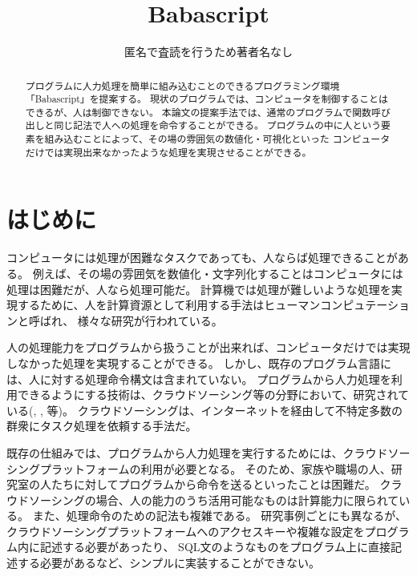 \documentclass[twoside]{wiss}
\begin{document}
\title{Babascript}
\etitle{} %

\author{匿名で査読を行うため著者名なし}

\begin{abstract}

プログラムに人力処理を簡単に組み込むことのできるプログラミング環境「Babascript」を提案する。
現状のプログラムでは、コンピュータを制御することはできるが、人は制御できない。
本論文の提案手法では、通常のプログラムで関数呼び出しと同じ記法で人への処理を命令することができる。
プログラムの中に人という要素を組み込むことによって、その場の雰囲気の数値化・可視化といった
コンピュータだけでは実現出来なかったような処理を実現させることができる。

\end{abstract}

\maketitle


\section{はじめに}
コンピュータには処理が困難なタスクであっても、人ならば処理できることがある。
例えば、その場の雰囲気を数値化・文字列化することはコンピュータには処理は困難だが、人なら処理可能だ。
計算機では処理が難しいような処理を実現するために、人を計算資源として利用する手法はヒューマンコンピュテーション\cite{humancomputation}と呼ばれ、
様々な研究が行われている。

人の処理能力をプログラムから扱うことが出来れば、コンピュータだけでは実現しなかった処理を実現することができる。
しかし、既存のプログラム言語には、人に対する処理命令構文は含まれていない。
プログラムから人力処理を利用できるようにする技術は、クラウドソーシング等の分野において、研究されている(\cite{automan}, \cite{crowddb}, \cite{crowdforge}等)。
クラウドソーシングは、インターネットを経由して不特定多数の群衆にタスク処理を依頼する手法だ\cite{riseofcrowdsourcing}。

既存の仕組みでは、プログラムから人力処理を実行するためには、クラウドソーシングプラットフォームの利用が必要となる。
そのため、家族や職場の人、研究室の人たちに対してプログラムから命令を送るといったことは困難だ。
クラウドソーシングの場合、人の能力のうち活用可能なものは計算能力に限られている。
また、処理命令のための記法も複雑である。
研究事例ごとにも異なるが、クラウドソーシングプラットフォームへのアクセスキーや複雑な設定をプログラム内に記述する必要があったり、
SQL文のようなものをプログラム上に直接記述する必要があるなど、シンプルに実装することができない。
\end{document}
